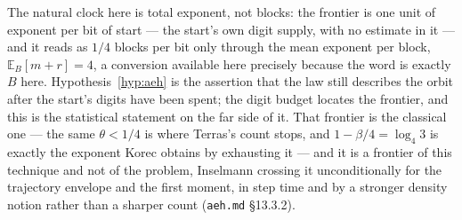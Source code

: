 \documentclass[11pt]{article}
\theoremstyle{remark}
\begin{document}
The natural clock here is total exponent, not blocks: the frontier is one unit of
exponent per bit of start --- the start's own digit supply, with no estimate in it
--- and it reads as $1/4$ blocks per bit only through the mean exponent per block,
$\mathbb{E}_B[m+r] = 4$, a conversion available here precisely because the word is
exactly $B$ here. Hypothesis~\ref{hyp:aeh} is the assertion that the law still
describes the orbit after the start's digits have been spent; the digit budget
locates the frontier, and this is the statistical statement on the far side of it.
That frontier is the classical one --- the same $\theta < 1/4$ is where Terras's
count stops, and $1 - \beta/4 = \log_4 3$ is exactly the exponent Korec
\cite{korec} obtains by exhausting it --- and it is a frontier of this technique
and not of the problem, Inselmann \cite{inselmann} crossing it unconditionally for
the trajectory envelope and the first moment, in step time and by a stronger
density notion rather than a sharper count (\texttt{aeh.md} \S13.3.2).
\end{document}
